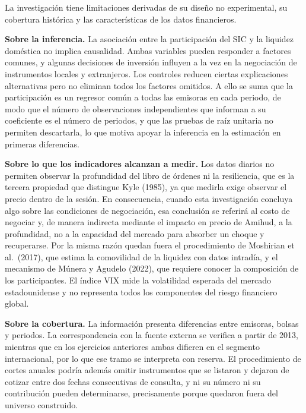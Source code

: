 
La investigación tiene limitaciones derivadas de su diseño no experimental, su cobertura histórica y las características de los datos financieros.

\textbf{Sobre la inferencia.} La asociación entre la participación del SIC y la liquidez doméstica no implica causalidad. Ambas variables pueden responder a factores comunes, y algunas decisiones de inversión influyen a la vez en la negociación de instrumentos locales y extranjeros. Los controles reducen ciertas explicaciones alternativas pero no eliminan todos los factores omitidos. A ello se suma que la participación es un regresor común a todas las emisoras en cada periodo, de modo que el número de observaciones independientes que informan a su coeficiente es el número de periodos, y que las pruebas de raíz unitaria no permiten descartarla, lo que motiva apoyar la inferencia en la estimación en primeras diferencias.

\textbf{Sobre lo que los indicadores alcanzan a medir.} Los datos diarios no permiten observar la profundidad del libro de órdenes ni la resiliencia, que es la tercera propiedad que distingue Kyle (1985), ya que medirla exige observar el precio dentro de la sesión. En consecuencia, cuando esta investigación concluya algo sobre las condiciones de negociación, esa conclusión se referirá al costo de negociar y, de manera indirecta mediante el impacto en precio de Amihud, a la profundidad, no a la capacidad del mercado para absorber un choque y recuperarse. Por la misma razón quedan fuera el procedimiento de Moshirian et al.~(2017), que estima la comovilidad de la liquidez con datos intradía, y el mecanismo de Múnera y Agudelo (2022), que requiere conocer la composición de los participantes. El índice VIX mide la volatilidad esperada del mercado estadounidense y no representa todos los componentes del riesgo financiero global.

\textbf{Sobre la cobertura.} La información presenta diferencias entre emisoras, bolsas y periodos. La correspondencia con la fuente externa se verifica a partir de 2013, mientras que en los ejercicios anteriores ambas difieren en el segmento internacional, por lo que ese tramo se interpreta con reserva. El procedimiento de cortes anuales podría además omitir instrumentos que se listaron y dejaron de cotizar entre dos fechas consecutivas de consulta, y ni su número ni su contribución pueden determinarse, precisamente porque quedaron fuera del universo construido.

